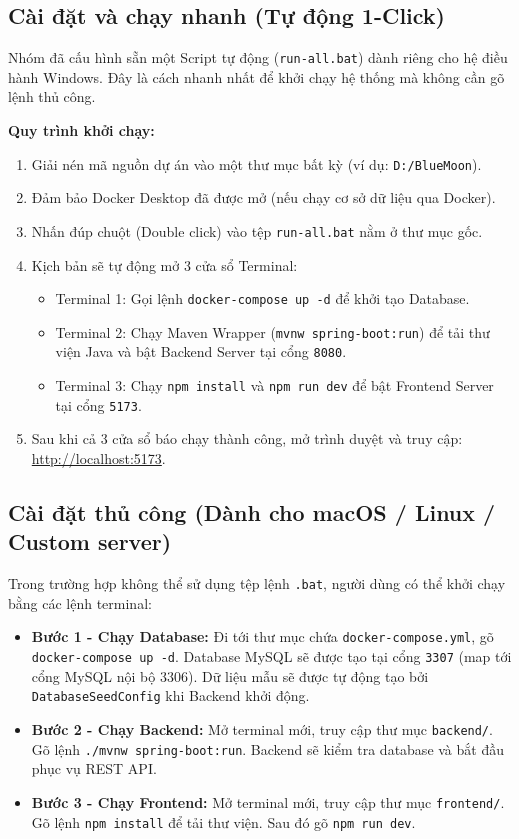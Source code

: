 \documentclass[12pt,a4paper]{article}
\begin{document}
\subsection{Cài đặt và chạy nhanh (Tự động 1-Click)}
Nhóm đã cấu hình sẵn một Script tự động (\texttt{run-all.bat}) dành riêng cho hệ điều hành Windows. Đây là cách nhanh nhất để khởi chạy hệ thống mà không cần gõ lệnh thủ công.

\textbf{Quy trình khởi chạy:}
\begin{enumerate}
    \item Giải nén mã nguồn dự án vào một thư mục bất kỳ (ví dụ: \texttt{D:/BlueMoon}).
    \item Đảm bảo Docker Desktop đã được mở (nếu chạy cơ sở dữ liệu qua Docker).
    \item Nhấn đúp chuột (Double click) vào tệp \texttt{run-all.bat} nằm ở thư mục gốc.
    \item Kịch bản sẽ tự động mở 3 cửa sổ Terminal:
    \begin{itemize}
        \item Terminal 1: Gọi lệnh \texttt{docker-compose up -d} để khởi tạo Database.
        \item Terminal 2: Chạy Maven Wrapper (\texttt{mvnw spring-boot:run}) để tải thư viện Java và bật Backend Server tại cổng \texttt{8080}.
        \item Terminal 3: Chạy \texttt{npm install} và \texttt{npm run dev} để bật Frontend Server tại cổng \texttt{5173}.
    \end{itemize}
    \item Sau khi cả 3 cửa sổ báo chạy thành công, mở trình duyệt và truy cập: \url{http://localhost:5173}.
\end{enumerate}

\subsection{Cài đặt thủ công (Dành cho macOS / Linux / Custom server)}
Trong trường hợp không thể sử dụng tệp lệnh \texttt{.bat}, người dùng có thể khởi chạy bằng các lệnh terminal:
\begin{itemize}
    \item \textbf{Bước 1 - Chạy Database:} Đi tới thư mục chứa \texttt{docker-compose.yml}, gõ \texttt{docker-compose up -d}. Database MySQL sẽ được tạo tại cổng \texttt{3307} (map tới cổng MySQL nội bộ 3306). Dữ liệu mẫu sẽ được tự động tạo bởi \texttt{DatabaseSeedConfig} khi Backend khởi động.
    \item \textbf{Bước 2 - Chạy Backend:} Mở terminal mới, truy cập thư mục \texttt{backend/}. Gõ lệnh \texttt{./mvnw spring-boot:run}. Backend sẽ kiểm tra database và bắt đầu phục vụ REST API. 
    \item \textbf{Bước 3 - Chạy Frontend:} Mở terminal mới, truy cập thư mục \texttt{frontend/}. Gõ lệnh \texttt{npm install} để tải thư viện. Sau đó gõ \texttt{npm run dev}.
\end{itemize}
\end{document}

